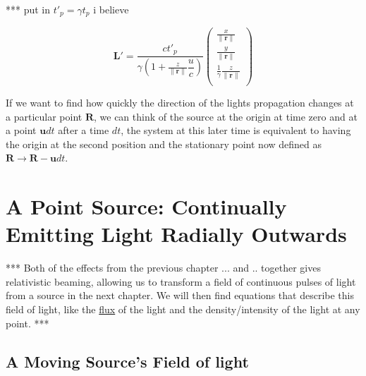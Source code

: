 *** put in $t'_p = \gamma t_p$ i believe

\begin{equation}
	\mathbf{L}{'} = \dfrac{{c}t{'}_{p}}{{\gamma}\left(1 + \frac{z}{\|\mathbf{r}\|} \dfrac{u}{c} \right)}
	\begin{pmatrix}
		\frac{x}{\|\mathbf{r}\|}                    \\
		\frac{y}{\|\mathbf{r}\|}                    \\
		\frac{1}{{\gamma}} \frac{z}{\|\mathbf{r}\|} \\
	\end{pmatrix}
\end{equation}

If we want to find how quickly the direction of the lights propagation changes at a particular point $\mathbf{R}$, we can think of the source at the origin at time zero and at a point $\mathbf{u} dt$ after a time $dt$, the system at this later time is equivalent to having the origin at the second position and the stationary point now defined as $\mathbf{R} \rightarrow \mathbf{R} - \mathbf{u} dt$.



\printbibliography[segment=\therefsegment, heading=subbibliography]

\chapter{A Point Source: Continually Emitting Light Radially Outwards} \label{ch: A Point Source Continually Emitting Light}

***
Both of the effects from the previous chapter ... and .. together gives relativistic beaming, allowing us to transform a field of continuous pulses of light from a source in the next chapter.
We will then find equations that describe this field of light, like the \hyperlink{def-flux}{flux} of the light and the density/intensity of the light at any point.
***

\section{A Moving Source's Field of light} \label{ch: A Moving Source's Field}

